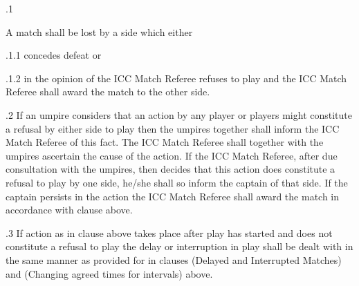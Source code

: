 \documentclass[12pt]{article}
\begin{document}
\vspace{\baselineskip}
{\fontsize{9pt}{10.8pt}.1 \tabto{0.49in} {\fontsize{8pt}{9.6pt}\selectfont A match shall be lost by a side which either\par}\par}\par


\vspace{\baselineskip}
\begin{adjustwidth}{0.49in}{0.0in}
{\fontsize{9pt}{10.8pt}.1.1 \tabto{1.17in} concedes defeat or\par}\par

\end{adjustwidth}


\vspace{\baselineskip}
\begin{adjustwidth}{1.18in}{0.06in}
{\fontsize{9pt}{10.8pt}.1.2 \tabto{1.17in} in the opinion of the ICC Match Referee refuses to play and the ICC Match Referee shall award the match to the other side.\par}\par

\end{adjustwidth}


\vspace{\baselineskip}
\begin{adjustwidth}{0.5in}{0.03in}
{\fontsize{9pt}{10.8pt}.2 \tabto{0.49in} If an umpire considers that an action by any player or players might constitute a refusal by either side to play then the umpires together shall inform the ICC Match Referee of this fact. The ICC Match Referee shall together with the umpires ascertain the cause of the action. If the ICC Match Referee, after due consultation with the umpires, then decides that this action does constitute a refusal to play by one side, he/she shall so inform the captain of that side. If the captain persists in the action the ICC Match Referee shall award the match in accordance with clause above.\par}\par

\end{adjustwidth}


\vspace{\baselineskip}
\begin{adjustwidth}{0.5in}{0.03in}
{\fontsize{9pt}{10.8pt}.3 \tabto{0.49in} If action as in clause above takes place after play has started and does not constitute a refusal to play the delay or interruption in play shall be dealt with in the same manner as provided for in clauses  (Delayed and Interrupted Matches) and (Changing agreed times for intervals) above.\par}\par

\end{adjustwidth}
\end{document}
